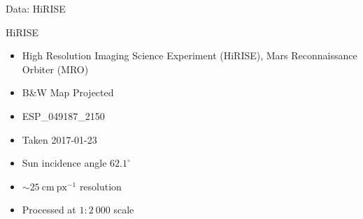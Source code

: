 \begin{frame}{Data: HiRISE}
    \begin{block}{HiRISE}
        \begin{itemize}
            \item High Resolution Imaging Science Experiment (HiRISE), Mars Reconnaissance Orbiter (MRO)
            \item B\&W Map Projected
            \item ESP\_049187\_2150
            \item Taken 2017-01-23
            \item Sun incidence angle $62.1^{\circ}$
            \item $\sim 25\ \mathrm{cm\ px^{-1}}$ resolution
            \item Processed at $1:2\ 000$ scale
        \end{itemize}
    \end{block}
\end{frame}